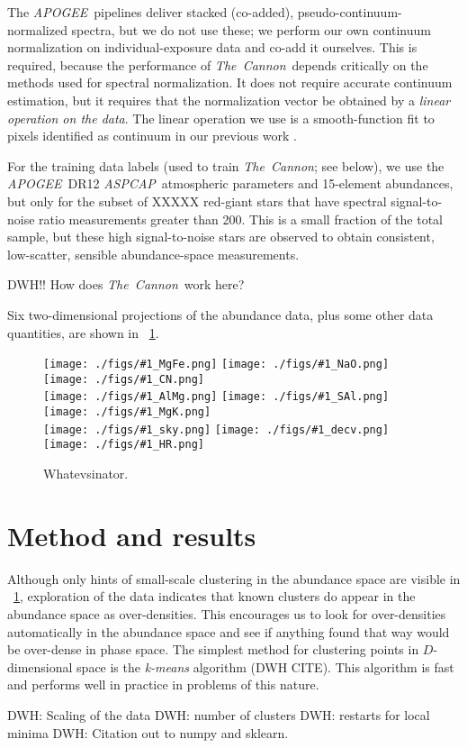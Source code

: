 \documentclass[12pt, letterpaper, preprint]{aastex}
\newcommand{\acronym}[1]{{\small{#1}}}
\newcommand{\project}[1]{\textsl{#1}}
\newcommand{\apogee}{\project{\acronym{APOGEE}}}
\newcommand{\aspcap}{\project{\acronym{ASPCAP}}}
\newcommand{\thecannon}{\project{The~Cannon}}
\newcommand{\insanefigure}[1]{%
\texttt{[image: ./figs/\#1\_MgFe.png]}%
\texttt{[image: ./figs/\#1\_NaO.png]}%
\texttt{[image: ./figs/\#1\_CN.png]}\\
\texttt{[image: ./figs/\#1\_AlMg.png]}%
\texttt{[image: ./figs/\#1\_SAl.png]}%
\texttt{[image: ./figs/\#1\_MgK.png]}\\
\texttt{[image: ./figs/\#1\_sky.png]}%
\texttt{[image: ./figs/\#1\_decv.png]}%
\texttt{[image: ./figs/\#1\_HR.png]}}
\begin{document}
The \apogee\ pipelines deliver stacked (co-added),
pseudo-continuum-normalized spectra, but we do not use these; we
perform our own continuum normalization on individual-exposure data
and co-add it ourselves.
This is required, because the performance of \thecannon\ depends
critically on the methods used for spectral normalization.  It does
not require accurate continuum estimation, but it requires that the
normalization vector be obtained by a \emph{linear operation on the
  data}.
The linear operation we use is a smooth-function fit to pixels
identified as continuum in our previous work \citep{thecannon}.

For the training data labels (used to train \thecannon; see below), we
use the \apogee\ \acronym{DR12} \aspcap\ atmospheric parameters and
15-element abundances, but only for the subset of XXXXX red-giant
stars that have spectral signal-to-noise ratio measurements greater
than 200.
This is a small fraction of the total sample, but these high
signal-to-noise stars are observed to obtain consistent, low-scatter,
sensible abundance-space measurements.

DWH!!  How does \thecannon\ work here?

Six two-dimensional projections of the abundance data, plus some other
data quantities, are shown in \figurename~\ref{fig:all}.

\begin{figure}[!p]
\insanefigure{all}
\caption{Whatevsinator.\label{fig:all}}
\end{figure}

\clearpage
\section{Method and results}

Although only hints of small-scale clustering in the abundance space
are visible in \figurename~\ref{fig:all}, exploration of the data indicates that
known clusters do appear in the abundance space as over-densities.
This encourages us to look for over-densities automatically in the
abundance space and see if anything found that way would be over-dense
in phase space.
The simplest method for clustering points in $D$-dimensional space is
the \emph{k-means} algorithm (DWH CITE).
This algorithm is fast and performs well in practice in problems of
this nature.

DWH: Scaling of the data
DWH: number of clusters
DWH: restarts for local minima
DWH: Citation out to numpy and sklearn.
\end{document}
